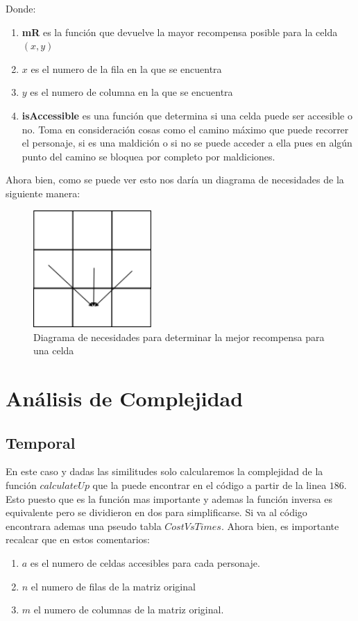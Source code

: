 \documentclass[12pt]{exam}
\begin{document}
Donde:
\begin{enumerate}
  \item \textbf{mR} es la función que devuelve la mayor recompensa posible para la celda $(x, y)$
  \item  $x$ es el numero de la fila en la que se encuentra
  \item $y$ es el numero de columna en la que se encuentra
  \item \textbf{isAccessible} es una función que determina si una celda puede ser accesible o no. Toma en consideración cosas como el camino máximo que puede recorrer el personaje, si es una maldición o si no se puede acceder a ella pues en algún punto del camino se bloquea por completo por maldiciones.
\end{enumerate}

Ahora bien, como se puede ver esto nos daría un diagrama de necesidades de la siguiente manera:
\begin{figure}[H]
  \centering
  \includegraphics[width=0.4\textwidth]{IMG/img1.png}
  \caption{Diagrama de necesidades para determinar la mejor recompensa para una celda}
  \label{fig:IMG-img1-png}
\end{figure}

\section{Análisis de Complejidad}
\subsection{Temporal}

En este caso y dadas las similitudes solo calcularemos la complejidad de la función $calculateUp$ que la puede encontrar en el código a partir de la linea  $186$. Esto puesto que es la función mas importante y ademas la función inversa es equivalente pero se dividieron en dos para simplificarse. Si va al código encontrara ademas una pseudo tabla $CostVsTimes$. Ahora bien, es importante recalcar que en estos comentarios:
\begin{enumerate}
  \item $a$ es el numero de celdas accesibles para cada personaje.
  \item $n$ el numero de filas de la matriz original
  \item  $m$ el numero de columnas de la matriz original.
\end{enumerate}
\end{document}
